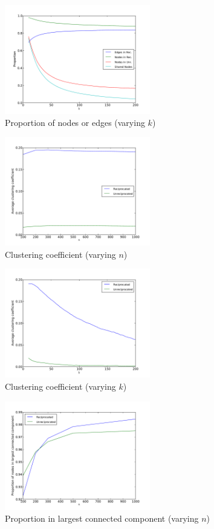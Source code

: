 \documentclass[conference]{IEEEtran}
\begin{document}
\begin{figure}[!t]
\centering
\includegraphics[width=2.5in]{proportion_edgesnodes_k}                
\caption{Proportion of nodes or edges (varying $k$)}
\label{fig_rur_propk}
\end{figure}

\begin{figure}[!t]
\centering
\includegraphics[width=2.5in]{average_clustering_n}          
\caption{Clustering coefficient (varying $n$)}
\label{fig_rur_cc_n}
\end{figure}

\begin{figure}[!t]
\centering
\includegraphics[width=2.5in]{average_clustering_k}      
\caption{Clustering coefficient (varying $k$)}
\label{fig_rur_cc_k}
\end{figure}

\begin{figure}[!t]
\centering
\includegraphics[width=2.5in]{proportion_largestcc_n}
\caption{Proportion in largest connected component (varying $n$)}
\label{fig_rur_lcc_n}
\end{figure}
\end{document}
